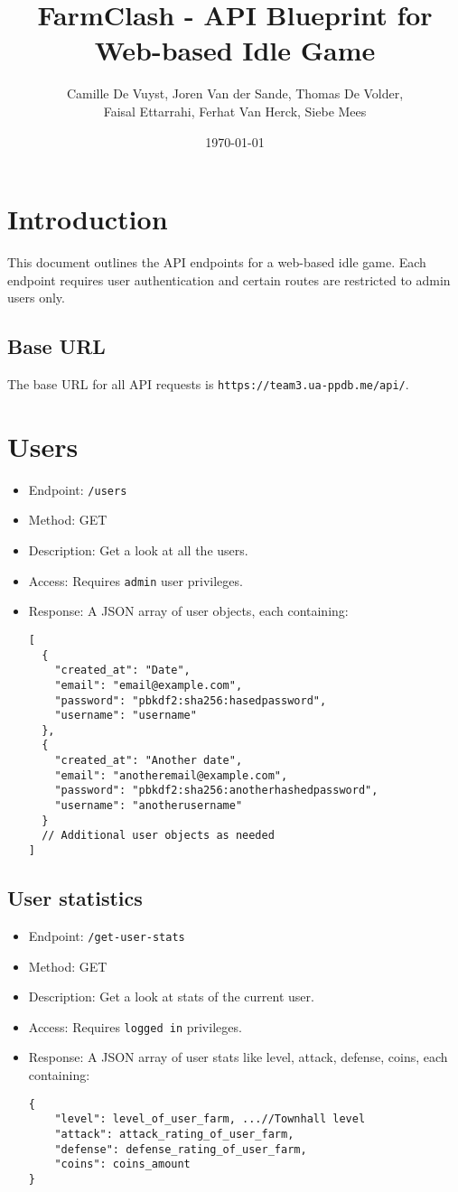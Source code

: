 \documentclass[12pt]{article}
\title{FarmClash - API Blueprint for Web-based Idle Game}
\author{Camille De Vuyst, Joren Van der Sande, Thomas De Volder,\\ Faisal Ettarrahi, Ferhat Van Herck, Siebe Mees}
\date{\today}
\begin{document}
\maketitle
\tableofcontents
\newpage

\section{Introduction}
This document outlines the API endpoints for a web-based idle game. Each endpoint requires user authentication and certain routes are restricted to admin users only.

\subsection{Base URL}
The base URL for all API requests is \texttt{https://team3.ua-ppdb.me/api/}.

\section{Users}
\begin{itemize}
    \item Endpoint: \texttt{/users}
    \item Method: GET
    \item Description: Get a look at all the users.
    \item Access: Requires \texttt{admin} user privileges.
    \item Response: A JSON array of user objects, each containing:
    \begin{verbatim}
[
  {
    "created_at": "Date",
    "email": "email@example.com",
    "password": "pbkdf2:sha256:hasedpassword",
    "username": "username"
  },
  {
    "created_at": "Another date",
    "email": "anotheremail@example.com",
    "password": "pbkdf2:sha256:anotherhashedpassword",
    "username": "anotherusername"
  }
  // Additional user objects as needed
]
    \end{verbatim}
\end{itemize}

\subsection{User statistics}
\begin{itemize}
    \item Endpoint: \texttt{/get-user-stats}
    \item Method: GET
    \item Description: Get a look at stats of the current user.
    \item Access: Requires \texttt{logged in} privileges.
    \item Response: A JSON array of user stats like level, attack, defense, coins, each containing:
    \begin{verbatim}
{
    "level": level_of_user_farm, ...//Townhall level
    "attack": attack_rating_of_user_farm,
    "defense": defense_rating_of_user_farm,
    "coins": coins_amount
}


    \end{verbatim}
\end{itemize}
\end{document}

